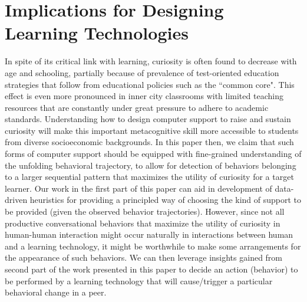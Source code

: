 \documentclass{llncs}
\begin{document}
\section{Implications for Designing Learning Technologies}
\vspace{-0.4cm}
In spite of its critical link with learning, curiosity is often found to decrease with age and schooling, partially because of prevalence of test-oriented education strategies that follow from educational policies such as the ``common core"\cite{porter2011common}. This effect is even more pronounced in inner city classrooms with limited teaching resources that are constantly under great pressure to adhere to academic standards. Understanding how to design computer support to raise and sustain curiosity will make this important metacognitive skill more accessible to students from diverse socioeconomic backgrounds. In this paper then, we claim that such forms of computer support should be equipped with fine-grained understanding of the unfolding behavioral trajectory, to allow for detection of behaviors belonging to a larger sequential pattern that maximizes the utility of curiosity for a target learner. Our work in the first part of this paper can aid in development of data-driven heuristics for providing a principled way of choosing the kind of support to be provided (given the observed behavior trajectories). However, since not all productive conversational behaviors that maximize the utility of curiosity in human-human interaction might occur naturally in interactions between human and a learning technology, it might be worthwhile to make some arrangements for the appearance of such behaviors. We can then leverage insights gained from second part of the work presented in this paper to decide an action (behavior) to be performed by a learning technology that will cause/trigger a particular behavioral change in a peer. 
\end{document}
